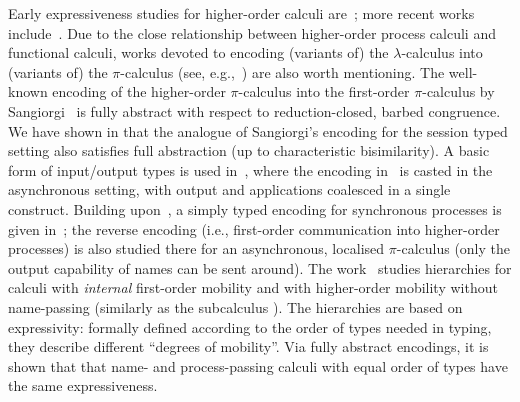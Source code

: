Early expressiveness studies for higher-order calculi are~\cite{Tho90,SangiorgiD:expmpa}; 
more recent works include~\cite{BundgaardHG06,DBLP:conf/icalp/LanesePSS10,DBLP:journals/iandc/LanesePSS11,XuActa2012,DBLP:conf/wsfm/XuYL13}.
Due to the close relationship between higher-order process calculi and functional calculi, 
works devoted to encoding (variants of) the $\lambda$-calculus into (variants of) the $\pi$-calculus (see, e.g.,~\cite{San92,DBLP:journals/tcs/Fu99,DBLP:journals/iandc/YoshidaBH04,BHY,DBLP:conf/concur/SangiorgiX14}) are also worth mentioning.
The well-known encoding of the higher-order $\pi$-calculus
into the first-order $\pi$-calculus 
by Sangiorgi~\cite{SangiorgiD:expmpa} 
is fully abstract with respect to reduction-closed, barbed congruence. 
We have shown in  that the analogue of Sangiorgi's encoding for the session typed setting also satisfies full abstraction (up to characteristic bisimilarity).
A basic form of input/output types is used in~\cite{DBLP:journals/tcs/Sangiorgi01}, where the encoding in~\cite{SangiorgiD:expmpa} is casted in the asynchronous setting, with output and applications coalesced in a single construct. Building upon~\cite{DBLP:journals/tcs/Sangiorgi01}, 
a simply typed encoding for synchronous processes is given in~\cite{SaWabook}; the reverse encoding (i.e.,  first-order communication into higher-order processes) is also studied there for an asynchronous, localised $\pi$-calculus (only the output capability of names can be sent around).
The work~\cite{San96int} studies hierarchies for calculi with \emph{internal} first-order mobility and 
with higher-order mobility without name-passing (similarly as the subcalculus \HO). 
The hierarchies are based on expressivity: 
formally defined according to the order of types needed in typing, 
they describe different ``degrees of mobility''.
Via fully abstract encodings, it is shown that that name- and process-passing calculi with equal order of types have the same expressiveness.


